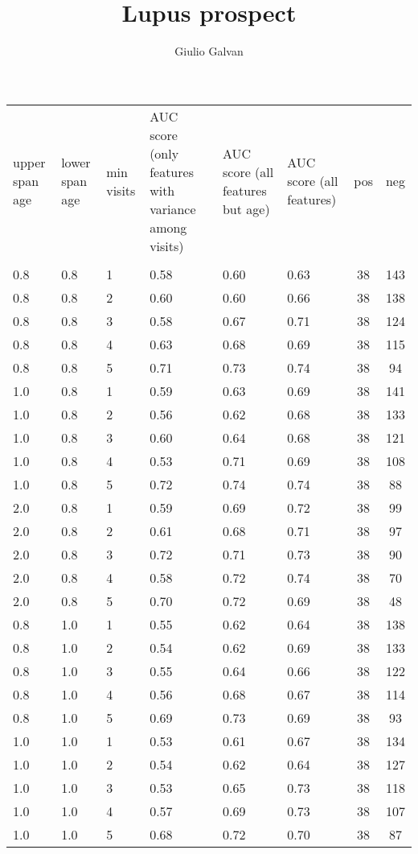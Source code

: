 \documentclass{article}
\title{Lupus prospect}
\author{Giulio Galvan}
\begin{document}
\begin{table}[!h]
	\centering
	\begin{tabular}{C{1cm}  C{1cm}  C{1cm} | C{2cm} C{2cm} C{2cm} |  c c}
		upper span age & lower span age & min visits & AUC score (only features with variance among visits) & AUC score (all features but age) & AUC score (all features)& pos & neg\\\\
		0.8 & 0.8 & 1 & 0.58 & 0.60 & 0.63 & 38 & 143\\
		0.8 & 0.8 & 2 & 0.60 & 0.60 & 0.66 & 38 & 138\\
		0.8 & 0.8 & 3 & 0.58 & 0.67 & 0.71 & 38 & 124\\
		0.8 & 0.8 & 4 & 0.63 & 0.68 & 0.69 & 38 & 115\\
		0.8 & 0.8 & 5 & 0.71 & 0.73 & 0.74 & 38 & 94\\
		1.0 & 0.8 & 1 & 0.59 & 0.63 & 0.69 & 38 & 141\\
		1.0 & 0.8 & 2 & 0.56 & 0.62 & 0.68 & 38 & 133\\
		1.0 & 0.8 & 3 & 0.60 & 0.64 & 0.68 & 38 & 121\\
		1.0 & 0.8 & 4 & 0.53 & 0.71 & 0.69 & 38 & 108\\
		1.0 & 0.8 & 5 & 0.72 & 0.74 & 0.74 & 38 & 88\\
		2.0 & 0.8 & 1 & 0.59 & 0.69 & 0.72 & 38 & 99\\
		2.0 & 0.8 & 2 & 0.61 & 0.68 & 0.71 & 38 & 97\\
		2.0 & 0.8 & 3 & 0.72 & 0.71 & 0.73 & 38 & 90\\
		2.0 & 0.8 & 4 & 0.58 & 0.72 & 0.74 & 38 & 70\\
		2.0 & 0.8 & 5 & 0.70 & 0.72 & 0.69 & 38 & 48\\
		0.8 & 1.0 & 1 & 0.55 & 0.62 & 0.64 & 38 & 138\\
		0.8 & 1.0 & 2 & 0.54 & 0.62 & 0.69 & 38 & 133\\
		0.8 & 1.0 & 3 & 0.55 & 0.64 & 0.66 & 38 & 122\\
		0.8 & 1.0 & 4 & 0.56 & 0.68 & 0.67 & 38 & 114\\
		0.8 & 1.0 & 5 & 0.69 & 0.73 & 0.69 & 38 & 93\\
		1.0 & 1.0 & 1 & 0.53 & 0.61 & 0.67 & 38 & 134\\
		1.0 & 1.0 & 2 & 0.54 & 0.62 & 0.64 & 38 & 127\\
		1.0 & 1.0 & 3 & 0.53 & 0.65 & 0.73 & 38 & 118\\
		1.0 & 1.0 & 4 & 0.57 & 0.69 & 0.73 & 38 & 107\\
		1.0 & 1.0 & 5 & 0.68 & 0.72 & 0.70 & 38 & 87\\

\end{tabular}
\end{table}
\end{document}
